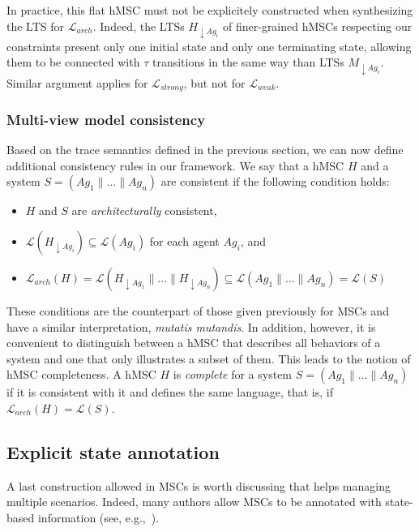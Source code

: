 In practice, this flat hMSC must not be explicitely constructed when synthesizing the LTS for $\mathcal{L}_{arch}$. Indeed, the LTSs $H_{\downarrow Ag_i}$ of finer-grained hMSCs respecting our constraints present only one initial state and only one terminating state, allowing them to be connected with $\tau$ transitions in the same way than LTSs $M_{\downarrow Ag_i}$. Similar argument applies for $\mathcal{L}_{strong}$, but not for $\mathcal{L}_{weak}$.

\subsubsection*{Multi-view model consistency}
 
Based on the trace semantics defined in the previous section, we can now define additional consistency rules in our framework. We say that a hMSC $H$ and a system $S = (Ag_1 \parallel \ldots \parallel Ag_n)$ are consistent if the following condition holds:

\begin{itemize}
\item $H$ and $S$ are \emph{architecturally} consistent,
\item $\mathcal{L}(H_{\downarrow Ag_i}) \subseteq \mathcal{L}(Ag_i)$ for each agent $Ag_i$, and
\item $\mathcal{L}_{arch}(H) = \mathcal{L}(H_{\downarrow Ag_1} \parallel \ldots \parallel H_{\downarrow Ag_n}) \subseteq \mathcal{L}(Ag_1 \parallel \ldots \parallel Ag_n) = \mathcal{L}(S)$
\end{itemize}

These conditions are the counterpart of those given previously for MSCs and have a similar interpretation, \emph{mutatis mutandis}. In addition, however, it is convenient to distinguish between a hMSC that describes all behaviors of a system and one that only illustrates a subset of them. This leads to the notion of hMSC completeness. A hMSC $H$ is \emph{complete} for a system $S = (Ag_1 \parallel \ldots \parallel Ag_n)$ if it is consistent with it and defines the same language, that is, if $\mathcal{L}_{arch}(H) = \mathcal{L}(S).$

\subsection{Explicit state annotation}

A last construction allowed in MSCs is worth discussing that helps managing multiple scenarios. Indeed, many authors allow MSCs to be annotated with state-based information (see, e.g.,~\cite{Kruger:2000, Whittle:2000}).






